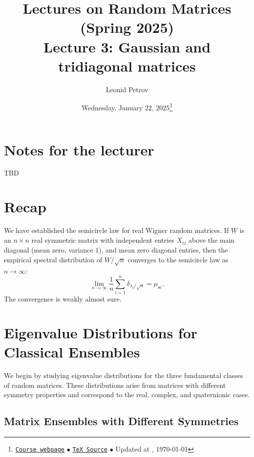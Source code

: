 \documentclass[letterpaper,11pt,oneside,reqno]{article}
\numberwithin{equation}{section}
\theoremstyle{definition}
\newenvironment{lnotes}{\section*{Notes for the lecturer}}{}
\begin{document}
\title{Lectures on Random Matrices
(Spring 2025)
\\Lecture 3: Gaussian and tridiagonal matrices}


\date{Wednesday, January 22, 2025\footnote{\href{https://lpetrov.cc/rmt25/}{\texttt{Course webpage}}
$\bullet$ \href{https://lpetrov.cc/rmt25/rmt25-notes/rmt2025-l03.tex}{\texttt{TeX Source}}
$\bullet$
Updated at \currenttime, \today}}

\author{Leonid Petrov}


\maketitle


\tableofcontents


\begin{lnotes}
	TBD
\end{lnotes}

\section{Recap}

We have established the semicircle law for
real Wigner random matrices.
If $W$ is an $n\times n$ real symmetric matrix with
independent entries $X_{ij}$ above the main diagonal
(mean zero, variance $1$), and mean zero diagonal entries,
then the empirical spectral distribution of $W/\sqrt{n}$
converges to the semicircle law as $n\to\infty$:
\begin{equation*}
	\lim_{n\to\infty} \frac{1}{n} \sum_{i=1}^n \delta_{\lambda_i/\sqrt n} =
	\mu_{\mathrm{sc}}.
\end{equation*}
The convergence is weakly almost sure.








\section{Eigenvalue Distributions for Classical Ensembles}

We begin by studying eigenvalue distributions for the three fundamental classes of random matrices. These distributions arise from matrices with different symmetry properties and correspond to the real, complex, and quaternionic cases.

\subsection{Matrix Ensembles with Different Symmetries}
\end{document}
